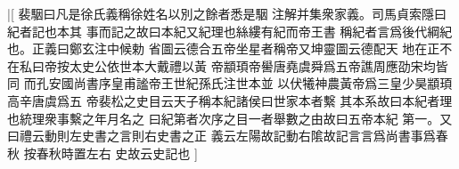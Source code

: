 |[%
裴駰曰凡是徐氏義稱徐姓名以別之餘者悉是駰%
注解并集衆家義。司馬貞索隱曰紀者記也本其%
%
事而記之故曰本紀又紀理也絲縷有紀而帝王書%
稱紀者言爲後代綱紀也。正義曰鄭玄注中候勅%
%
省圖云德合五帝坐星者稱帝又坤靈圖云德配天%
地在正不在私曰帝按太史公依世本大戴禮以黃%
%
帝顓頊帝嚳唐堯虞舜爲五帝譙周應劭宋均皆同%
而孔安國尚書序皇甫謐帝王世紀孫氏注世本並%
%
以伏犧神農黃帝爲三皇少昊顓頊高辛唐虞爲五%
帝裴松之史目云天子稱本紀諸侯曰世家本者繫%
%
其本系故曰本紀者理也統理衆事繫之年月名之%
曰紀第者次序之目一者舉數之由故曰五帝本紀%
%
第一。又曰禮云動則左史書之言則右史書之正%
義云左陽故記動右隂故記言言爲尚書事爲春秋%
%
按春秋時置左右%
史故云史記也%
]%
